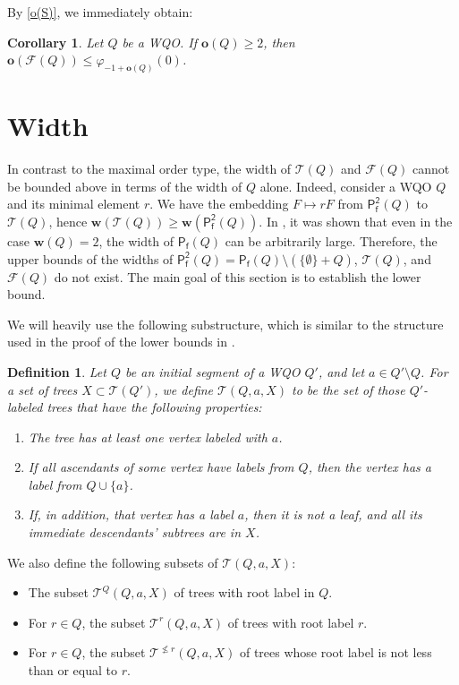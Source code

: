 \documentclass[10pt,a4paper]{amsart}
\let \leq \leqslant
\let \nleq \nleqslant
\let \geq \geqslant
\let \phi \varphi
\renewcommand \S [1][]{\mathsf{P_f^{#1}}}
\def \T {\mathcal{T}}
\def \F {\mathcal{F}}
\def \o {\textbf{o}}
\def \w {\textbf{w}}
\newtheorem{corollary}{Corollary}
\newtheorem{definition}{Definition}
\begin{document}
By \cref{o(S)}, we immediately obtain:

\begin{corollary}
    Let $Q$ be a WQO. If $\o(Q) \geq 2$, then $\o(\F(Q)) \leq \phi_{-1+\o(Q)}(0)$.
\end{corollary}







\section{Width}\label{section w}

In contrast to the maximal order type, the width of $\T(Q)$ and $\F(Q)$ cannot be bounded above in terms of the width of $Q$ alone. Indeed, consider a WQO $Q$ and its minimal element $r$. We have the embedding $F \mapsto rF$ from $\S[2](Q)$ to $\T(Q)$, hence $\w(\T(Q)) \geq \w(\S[2](Q))$. In \cite[example 3.7]{Abriola2023}, it was shown that even in the case $\w(Q) = 2$, the width of $\S(Q)$ can be arbitrarily large. Therefore, the upper bounds of the widths of $\S[2](Q) = \S(Q) \setminus (\{\emptyset\} + Q)$, $\T(Q)$, and $\F(Q)$ do not exist. The main goal of this section is to establish the lower bound.

We will heavily use the following substructure, which is similar to the structure used in the proof of the lower bounds in \cite{Selivanov2025}.
\begin{definition}\label{w rec tree}
    Let $Q$ be an initial segment of a WQO $Q'$, and let $a \in Q' \setminus Q$. For a set of trees $X \subset \T(Q')$, we define $\T(Q, a, X)$ to be the set of those $Q'$-labeled trees that have the following properties:
    \begin{enumerate}
        \item The tree has at least one vertex labeled with $a$.
        \item If all ascendants of some vertex have labels from $Q$, then the vertex has a label from $Q \cup \{a\}$.
        \item If, in addition, that vertex has a label $a$, then it is not a leaf, and all its immediate descendants' subtrees are in $X$.
    \end{enumerate}
\end{definition}

We also define the following subsets of $\T(Q, a, X)$:
\begin{itemize}
    \item The subset $\T^Q(Q, a, X)$ of trees with root label in $Q$.
    \item For $r \in Q$, the subset $\T^r(Q, a, X)$ of trees with root label $r$.
    \item For $r \in Q$, the subset $\T^{\nleq r}(Q, a, X)$ of trees whose root label is not less than or equal to $r$.
\end{itemize}
\end{document}
